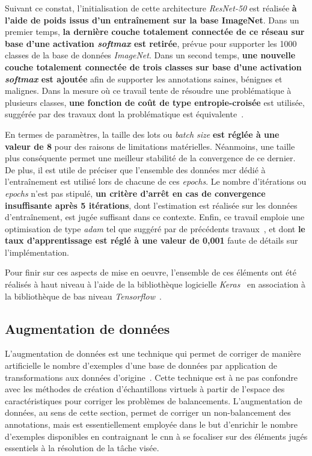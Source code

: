 Suivant ce constat, l'initialisation de cette architecture \textit{ResNet-50} est réalisée \textbf{à l'aide de poids issus d'un entraînement sur la base ImageNet}. Dans un premier temps, \textbf{la dernière couche totalement connectée de ce réseau sur base d'une activation \textit{softmax} est retirée}, prévue pour supporter les 1000 classes de la base de données \textit{ImageNet}. Dans un second temps, \textbf{une nouvelle couche totalement connectée de trois classes sur base d'une activation \textit{softmax} est ajoutée} afin de supporter les annotations saines, bénignes et malignes. Dans la mesure où ce travail tente de résoudre une problématique à plusieurs classes, \textbf{une fonction de coût de type entropie-croisée} est utilisée, suggérée par des travaux dont la problématique est équivalente~\cite{Barbu2016,Park2019}.\par

En termes de paramètres, la taille des lots ou \textit{batch size} \textbf{est réglée à une valeur de 8} pour des raisons de limitations matérielles. Néanmoins, une taille plus conséquente permet une meilleur stabilité de la convergence de ce dernier. De plus, il est utile de préciser que l'ensemble des données \gls{mcr} dédié à l'entraînement est utilisé lors de chacune de ces \textit{epochs}. Le nombre d'itérations ou \textit{epochs} n'est pas stipulé, \textbf{un critère d'arrêt en cas de convergence insuffisante après 5 itérations}, dont l'estimation est réalisée sur les données d'entraînement, est jugée suffisant dans ce contexte. Enfin, ce travail emploie une optimisation de type \textit{adam} tel que suggéré par de précédents travaux~\cite{Barbu2016,Park2019}, et dont \textbf{le taux d'apprentissage est réglé à une valeur de 0,001} faute de détails sur l'implémentation.\par

Pour finir sur ces aspects de mise en oeuvre, l'ensemble de ces éléments ont été réalisés à haut niveau à l'aide de la bibliothèque logicielle \textit{Keras}~\cite{chollet2015} en association à la bibliothèque de bas niveau \textit{Tensorflow}~\cite{Tensorflow2016}.\par

\subsection{Augmentation de données}
L'augmentation de données est une technique qui permet de corriger de manière artificielle le nombre d'exemples d'une base de données par application de transformations aux données d'origine~\cite{Wong2016,Taylor2018}. Cette technique est à ne pas confondre avec les méthodes de création d'échantillons virtuels à partir de l'espace des caractéristiques pour corriger les problèmes de balancements. L'augmentation de données, au sens de cette section, permet de corriger un non-balancement des annotations, mais est essentiellement employée dans le but d'enrichir le nombre d'exemples disponibles en contraignant le \gls{cnn} à se focaliser sur des éléments jugés essentiels à la résolution de la tâche visée.\par

